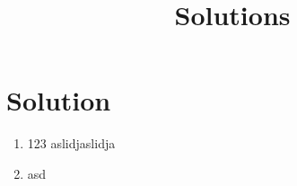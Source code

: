 \documentclass{article}
\begin{document}


\section*{Solution}
\title{Solutions}
\begin{enumerate}
        \item 123
aslidjaslidja
        \item asd

\end{enumerate}
\end{document}
